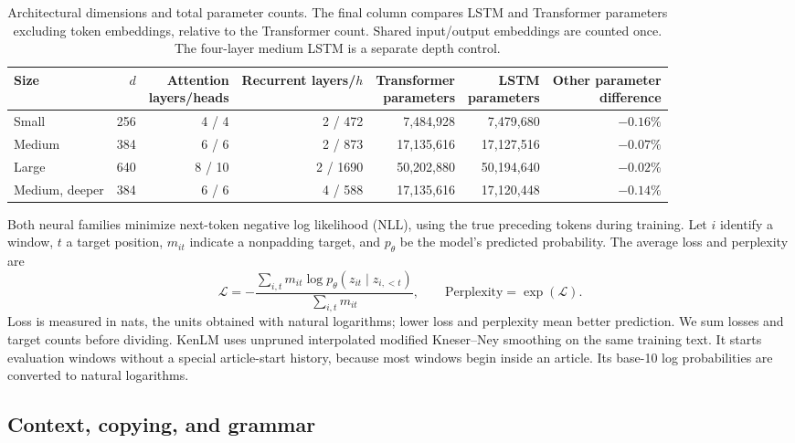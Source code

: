 \documentclass[10pt]{article}
\begin{document}
\begin{table}[t]
\centering
\small
\begin{tabular}{lrrrrrr}
\toprule
Size & $d$ & \shortstack{Attention\\layers/heads} & \shortstack{Recurrent\\layers/$h$} & \shortstack{Transformer\\parameters} & \shortstack{LSTM\\parameters} & \shortstack{Other parameter\\difference} \\
\midrule
Small & 256 & 4 / 4 & 2 / 472 & 7,484,928 & 7,479,680 & $-0.16\%$ \\
Medium & 384 & 6 / 6 & 2 / 873 & 17,135,616 & 17,127,516 & $-0.07\%$ \\
Large & 640 & 8 / 10 & 2 / 1690 & 50,202,880 & 50,194,640 & $-0.02\%$ \\
Medium, deeper & 384 & 6 / 6 & 4 / 588 & 17,135,616 & 17,120,448 & $-0.14\%$ \\
\bottomrule
\end{tabular}
\caption{Architectural dimensions and total parameter counts. The final column compares LSTM and Transformer parameters excluding token embeddings, relative to the Transformer count. Shared input/output embeddings are counted once. The four-layer medium LSTM is a separate depth control.}
\label{tab:parameters}
\end{table}

Both neural families minimize next-token negative log likelihood (NLL), using the true preceding tokens during training. Let $i$ identify a window, $t$ a target position, $m_{it}$ indicate a nonpadding target, and $p_\theta$ be the model's predicted probability. The average loss and perplexity are
\begin{equation}
\mathcal{L}=-\frac{\sum_{i,t}m_{it}\log p_\theta(z_{it}\mid z_{i,<t})}{\sum_{i,t}m_{it}},
\qquad \mathrm{Perplexity}=\exp(\mathcal{L}).
\label{eq:loss}
\end{equation}
Loss is measured in nats, the units obtained with natural logarithms; lower loss and perplexity mean better prediction. We sum losses and target counts before dividing. KenLM uses unpruned interpolated modified Kneser--Ney smoothing on the same training text. It starts evaluation windows without a special article-start history, because most windows begin inside an article. Its base-10 log probabilities are converted to natural logarithms.

\subsection{Context, copying, and grammar}
\end{document}
